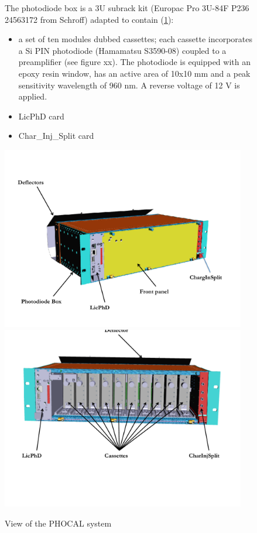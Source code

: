 \begin{figure}[htbp]

The photodiode box is a 3U subrack kit (Europac Pro 3U-84F P236 24563172 from Schroff) adapted to contain (\ref{fig:lasphotodiodebox}):
\begin{itemize}
\item a set of ten modules dubbed cassettes; each cassette incorporates a Si PIN photodiode (Hamamatsu S3590-08) coupled to a preamplifier (see figure xx). The photodiode is equipped with an epoxy resin window, has an active area of 10x10 mm and a peak sensitivity wavelength of 960 nm. A reverse voltage of 12 V is applied.
\item LicPhD card
\item Char_Inj_Split card
\end{itemize}



\centering
\includegraphics[height=8cm]{figures/Photodiodebox.pdf}
\includegraphics[height=8cm]{figures/Photodiodebox2.pdf}
\caption{View of the PHOCAL system}\label{fig:lasphotodiodebox}
\end{figure}